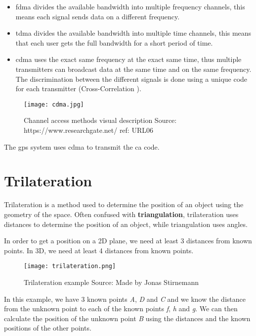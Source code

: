 \begin{itemize}
	\item \gls{fdma} divides the available bandwidth into multiple frequency channels, this means each signal sends data on a different frequency.
	\item \gls{tdma} divides the available bandwidth into multiple time channels, this means that each user gets the full bandwidth for a short period of time.
	\item \gls{cdma} uses the exact same frequency at the exact same time, thus multiple transmitters can broadcast data at the same time and on the same frequency. The discrimination between the different signals is done using a unique code for each transmitter (Cross-Correlation ).
\end{itemize}


\begin{figure}[H]
	\centering
	\texttt{[image: cdma.jpg]}
	\caption[Channel access methods]{Channel access methods visual description Source: https://www.researchgate.net/ ref: URL06}
	\label{fig:cdma}
\end{figure}

The \gls{gps} system uses \gls{cdma} to transmit the \gls{ca} code.

\section{Trilateration}

Trilateration is a method used to determine the position of an object using the geometry of the space. Often confused with \textbf{triangulation}, trilateration uses distances to determine the position of an object, while triangulation uses angles.

In order to get a position on a 2D plane, we need at least 3 distances from known points. In 3D, we need at least 4 distances from known points.

\begin{figure}[H]
	\centering
	\texttt{[image: trilateration.png]}
	\caption[Trilateration example]{Trilateration example Source: Made by Jonas Stirnemann}
	\label{fig:trilateration_example}
\end{figure}

In this example, we have 3 known points \textit{A}, \textit{D} and \textit{C} and we know the distance from the unknown point to each of the known points \textit{f}, \textit{h} and \textit{g}. We can then calculate the position of the unknown point \textit{B} using the distances and the known positions of the other points.

